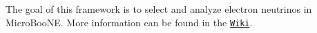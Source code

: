 The goal of this framework is to select and analyze electron neutrinos in Micro\-Boo\-N\-E. More information can be found in the \href{https://github.com/ubneutrinos/searchingfornues/wiki}{\tt Wiki}. 